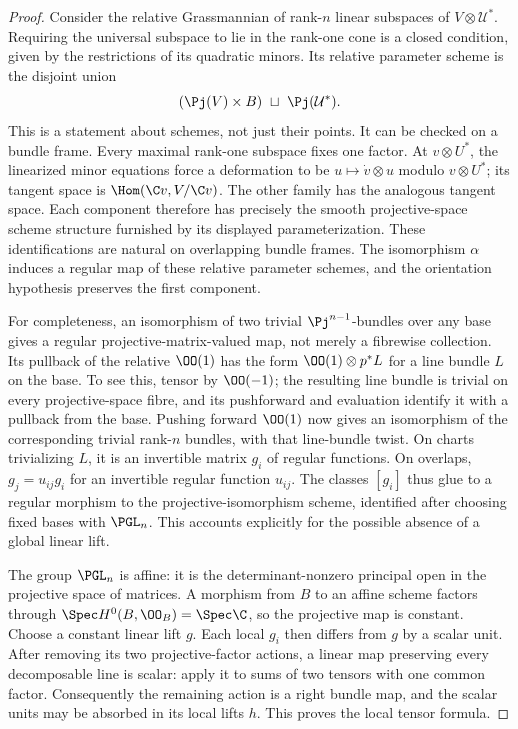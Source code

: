 \begin{proof}
Consider the relative Grassmannian of rank-\(n\) linear subspaces
of \(V\otimes\mathcal U^*\).  Requiring the universal subspace
to lie in the rank-one cone is a closed condition, given by the
restrictions of its quadratic minors.  Its relative parameter
scheme is the disjoint union
\[
 (\Pj(V)\times B)\ \sqcup\ \Pj(\mathcal U^*).
\]
This is a statement about schemes, not just their points.  It can
be checked on a bundle frame.  Every maximal rank-one subspace
fixes one factor.  At \(v\otimes U^*\), the linearized minor
equations force a deformation to be
\(u\mapsto \dot v\otimes u\) modulo \(v\otimes U^*\);
its tangent space is \(\Hom(\C v,V/\C v)\).
The other family has the analogous tangent space.  Each component
therefore has precisely the smooth projective-space scheme
structure furnished by its displayed parameterization.  These
identifications are natural on overlapping bundle frames.
The isomorphism \(\alpha\) induces a regular map of these relative
parameter schemes, and the orientation hypothesis preserves the
first component.

For completeness, an isomorphism of two trivial \(\Pj^{n-1}\)-bundles
over any base gives a regular projective-matrix-valued map, not
merely a fibrewise collection.  Its pullback of the relative
\(\OO(1)\) has the form \(\OO(1)\otimes p^*L\) for a line
bundle \(L\) on the base.  To see this, tensor by \(\OO(-1)\);
the resulting line bundle is trivial on every projective-space
fibre, and its pushforward and evaluation identify it with a
pullback from the base.  Pushing forward \(\OO(1)\) now gives
an isomorphism of the corresponding trivial rank-\(n\) bundles,
with that line-bundle twist.  On charts trivializing \(L\), it
is an invertible matrix \(g_i\) of regular functions.  On overlaps,
\(g_j=u_{ij}g_i\) for an invertible regular function \(u_{ij}\).
The classes \([g_i]\) thus glue to a regular morphism to the
projective-isomorphism scheme, identified after choosing fixed
bases with \(\PGL_n\).  This accounts explicitly for the possible
absence of a global linear lift.

The group \(\PGL_n\) is affine: it is the determinant-nonzero
principal open in the projective space of matrices.  A morphism
from \(B\) to an affine scheme factors through
\(\Spec H^0(B,\OO_B)=\Spec\C\), so the projective map is constant.
Choose a constant linear lift \(g\).  Each local \(g_i\) then
differs from \(g\) by a scalar unit.  After removing its two
projective-factor actions, a linear map preserving every
decomposable line is scalar: apply it to sums of two tensors with
one common factor.  Consequently the remaining action is a right
bundle map, and the scalar units may be absorbed in its local
lifts \(h\).  This proves the local tensor formula.


\end{proof}

